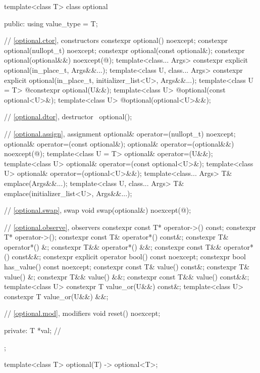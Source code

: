 %
%
\begin{codeblock}
template<class T>
  class optional {
  public:
    using value_type = T;

    // \ref{optional.ctor}, constructors
    constexpr optional() noexcept;
    constexpr optional(nullopt_t) noexcept;
    constexpr optional(const optional&);
    constexpr optional(optional&&) noexcept(@\seebelow@);
    template<class... Args>
      constexpr explicit optional(in_place_t, Args&&...);
    template<class U, class... Args>
      constexpr explicit optional(in_place_t, initializer_list<U>, Args&&...);
    template<class U = T>
      @\EXPLICIT@ constexpr optional(U&&);
    template<class U>
      @\EXPLICIT@ optional(const optional<U>&);
    template<class U>
      @\EXPLICIT@ optional(optional<U>&&);

    // \ref{optional.dtor}, destructor
    ~optional();

    // \ref{optional.assign}, assignment
    optional& operator=(nullopt_t) noexcept;
    optional& operator=(const optional&);
    optional& operator=(optional&&) noexcept(@\seebelow@);
    template<class U = T> optional& operator=(U&&);
    template<class U> optional& operator=(const optional<U>&);
    template<class U> optional& operator=(optional<U>&&);
    template<class... Args> T& emplace(Args&&...);
    template<class U, class... Args> T& emplace(initializer_list<U>, Args&&...);

    // \ref{optional.swap}, swap
    void swap(optional&) noexcept(@\seebelow@);

    // \ref{optional.observe}, observers
    constexpr const T* operator->() const;
    constexpr T* operator->();
    constexpr const T& operator*() const&;
    constexpr T& operator*() &;
    constexpr T&& operator*() &&;
    constexpr const T&& operator*() const&&;
    constexpr explicit operator bool() const noexcept;
    constexpr bool has_value() const noexcept;
    constexpr const T& value() const&;
    constexpr T& value() &;
    constexpr T&& value() &&;
    constexpr const T&& value() const&&;
    template<class U> constexpr T value_or(U&&) const&;
    template<class U> constexpr T value_or(U&&) &&;

    // \ref{optional.mod}, modifiers
    void reset() noexcept;

  private:
    T *val; // \expos
  };

template<class T> optional(T) -> optional<T>;
\end{codeblock}

